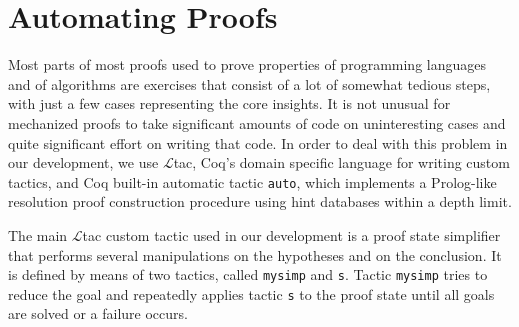 \section{Automating Proofs}\label{tactics}

Most parts of most proofs used to prove properties of programming
languages and of algorithms are exercises that consist of a lot of
somewhat tedious steps, with just a few cases representing the core
insights. It is not unusual for mechanized proofs to take significant
amounts of code on uninteresting cases and quite significant effort on
writing that code. In order to deal with this problem in our
development, we use $\mathcal{L}$tac, Coq's domain specific language
for writing custom tactics, and Coq built-in automatic tactic
\texttt{auto}, which implements a Prolog-like resolution proof
construction procedure using hint databases within a depth limit.

The main $\mathcal{L}$tac custom tactic used in our development is a
proof state simplifier that performs several manipulations on the
hypotheses and on the conclusion. It is defined by means of two
tactics, called \texttt{mysimp} and \texttt{s}. Tactic \texttt{mysimp}
tries to reduce the goal and repeatedly applies tactic \texttt{s} to
the proof state until all goals are solved or a failure occurs.

